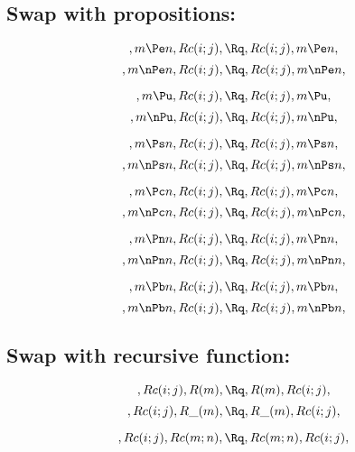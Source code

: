 \bigskip
\bigskip
\subsection{Swap with propositions:}
\[, m \Pe n, Rc(i;j), \Rq , Rc(i;j), m \Pe n,\]
\[, m \nPe n, Rc(i;j), \Rq , Rc(i;j), m \nPe n,\]

\[, m \Pu, Rc(i;j), \Rq , Rc(i;j), m \Pu,\]
\[, m \nPu, Rc(i;j), \Rq , Rc(i;j), m \nPu,\]

\[, m \Ps n, Rc(i;j), \Rq , Rc(i;j), m \Ps n,\]
\[, m \nPs n, Rc(i;j), \Rq , Rc(i;j), m \nPs n,\]

\[, m \Pc n, Rc(i;j), \Rq , Rc(i;j), m \Pc n,\]
\[, m \nPc n, Rc(i;j), \Rq , Rc(i;j), m \nPc n,\]

\[, m \Pn n, Rc(i;j), \Rq , Rc(i;j), m \Pn n,\]
\[, m \nPn n, Rc(i;j), \Rq , Rc(i;j), m \nPn n,\]

\[, m \Pb n, Rc(i;j), \Rq , Rc(i;j), m \Pb n,\]
\[, m \nPb n, Rc(i;j), \Rq , Rc(i;j), m \nPb n,\]





\bigskip
\bigskip
\subsection{Swap with recursive function:}
\[, Rc(i;j), R(m), \Rq , R(m), Rc(i;j),\]
\[, Rc(i;j), R\_(m), \Rq , R\_(m), Rc(i;j),\]


\[, Rc(i;j), Rc(m;n), \Rq , Rc(m;n), Rc(i;j),\]


